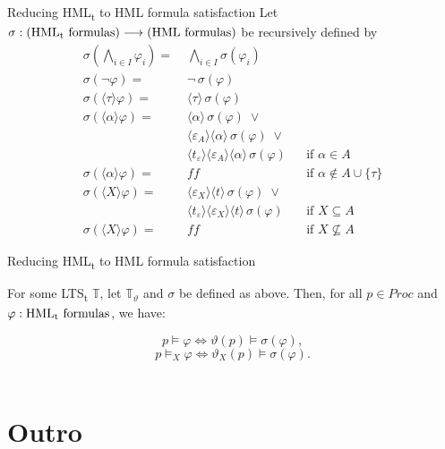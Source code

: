\documentclass[american]{beamer}
\newcommand{\LTSt}{LTS\textsubscript{t}}
\newcommand{\HMLt}{HML\textsubscript{t}}
\begin{document}
\begin{frame}{Reducing \HMLt{} to HML formula satisfaction}
Let $\sigma : (\text{\HMLt{} formulas}) \longrightarrow (\text{HML formulas})$ be recursively defined by
\begin{align*}
    \sigma(\textstyle\bigwedge_{i \in I} \varphi_i) =\;& \textstyle\bigwedge_{i \in I} \sigma(\varphi_i) &\\
    \sigma(\neg\varphi) =\;& \neg\,\sigma(\varphi)\\
    \sigma(\langle\tau\rangle\varphi) =\;& \langle\tau\rangle\,\sigma(\varphi)\\
    \sigma(\langle\alpha\rangle\varphi) =\;& 
        \langle\alpha\rangle\,\sigma(\varphi)\;\vee\\
        &\langle\varepsilon_A\rangle\langle\alpha\rangle\,\sigma(\varphi)\;\vee\\ 
        &\langle{}t_\varepsilon\rangle\langle\varepsilon_A\rangle\langle\alpha\rangle\,\sigma(\varphi) && \text{if $\alpha \in A$}\\
    \sigma(\langle\alpha\rangle\varphi) =\;& f\!\!f && \text{if $\alpha \notin A \cup \{\tau\}$}\\
    \sigma(\langle{}X\rangle\varphi) =\;&
        \langle\varepsilon_X\rangle\langle{}t\rangle\,\sigma(\varphi)\;\vee\\
        &\langle{}t_\varepsilon\rangle\langle\varepsilon_X\rangle\langle{}t\rangle\,\sigma(\varphi) && \text{if $X \subseteq A$} \\
    \sigma(\langle{}X\rangle\varphi) =\;& f\!\!f && \text{if $X \not\subseteq A$}
\end{align*}
\end{frame}

\begin{frame}{Reducing \HMLt{} to HML formula satisfaction}
\begin{theorem}
For some \LTSt{} $\mathbb{T}$, let $\mathbb{T}_\vartheta$ and $\sigma$ be defined as above. Then, for all $p \in \mathit{Proc}$ and $\varphi : \text{\HMLt{} formulas}$, we have:

$$p \vDash \varphi \iff \vartheta(p) \vDash \sigma(\varphi),$$
$$p \vDash_X \varphi \iff \vartheta_X(p) \vDash \sigma(\varphi).$$
\\[1em]
\end{theorem}
\end{frame}

\section{Outro}
\end{document}
